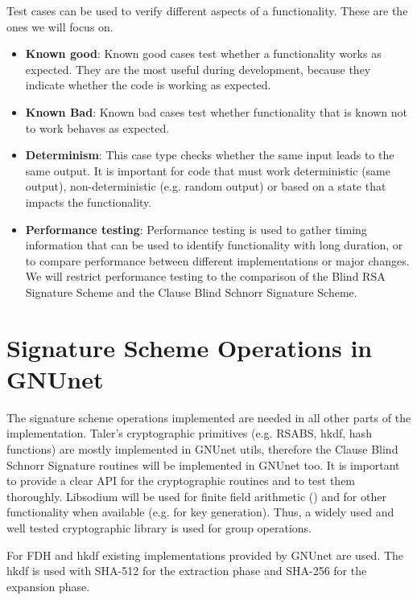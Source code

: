Test cases can be used to verify different aspects of a functionality.
These are the ones we will focus on.
\begin{itemize}
  \item \textbf{Known good}:
        Known good cases test whether a functionality works as expected.
        They are the most useful during development, because they indicate whether the code is working as expected.
  \item \textbf{Known Bad}:
        Known bad cases test whether functionality that is known not to work behaves as expected.
  \item \textbf{Determinism}:
        This case type checks whether the same input leads to the same output.
        It is important for code that must work deterministic (same output), non-deterministic (e.g. random output) or based on a state that impacts the functionality.
  \item \textbf{Performance testing}:
        Performance testing is used to gather timing information that can be used to identify functionality with long duration, or to  compare performance between different implementations or major changes.
        We will restrict performance testing to the comparison of the Blind RSA Signature Scheme and the Clause Blind Schnorr Signature Scheme.
\end{itemize}


\section{Signature Scheme Operations in GNUnet}
\label{sec:specification-signature-scheme}

The signature scheme operations implemented are needed in all other parts of the implementation.
Taler's cryptographic primitives (e.g. \gls{RSABS}, \gls{hkdf}, hash functions) are mostly implemented in GNUnet utils, therefore the Clause Blind Schnorr Signature routines will be implemented in GNUnet too.
It is important to provide a clear API for the cryptographic routines and to test them thoroughly.
Libsodium will be used for finite field arithmetic (\cite{libsodium:finite-field-arithmetic}) and for other functionality when available (e.g. for key generation).
Thus, a widely used and well tested cryptographic library is used for group operations.

For \acl{FDH} and \gls{hkdf} existing implementations provided by GNUnet are used.
The \gls{hkdf} is used with SHA-512 for the extraction phase and SHA-256 for the expansion phase.

